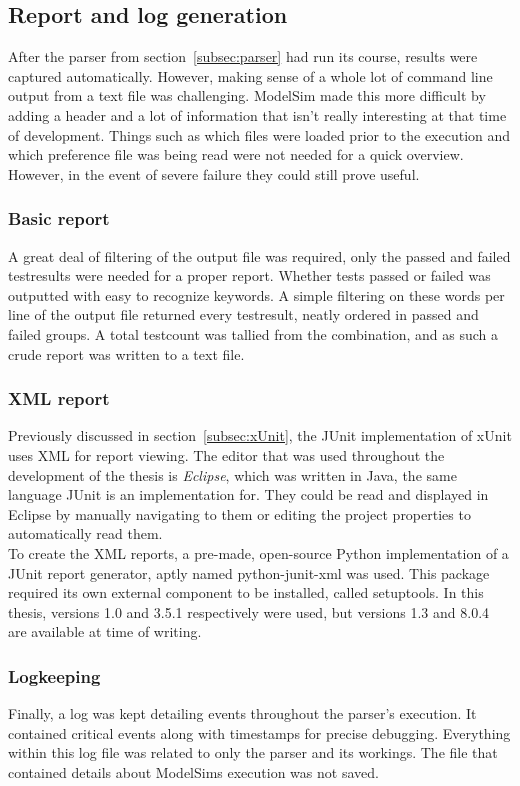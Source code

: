 \documentclass[11pt,british]{article}
\begin{document}
\subsection{Report and log generation}
\label{subsec:reports}
After the parser from section~\ref{subsec:parser} had run its course, results were captured automatically. However, making sense of a whole lot of command line output from a text file was challenging. ModelSim made this more difficult by adding a header and a lot of information that isn't really interesting at that time of development. Things such as which files were loaded prior to the execution and which preference file was being read were not needed for a quick overview. However, in the event of severe failure they could still prove useful.

\subsubsection{Basic report}
A great deal of filtering of the output file was required, only the passed and failed testresults were needed for a proper report. Whether tests passed or failed was outputted with easy to recognize keywords. A simple filtering on these words per line of the output file returned every testresult, neatly ordered in passed and failed groups. A total testcount was tallied from the combination, and as such a crude report was written to a text file.

\subsubsection{XML report}
Previously discussed in section~\ref{subsec:xUnit}, the JUnit implementation of xUnit uses \gls{XML} for report viewing. The editor that was used throughout the development of the thesis is \emph{Eclipse}, which was written in Java, the same language JUnit is an implementation for. They could be read and displayed in Eclipse by manually navigating to them or editing the project properties to automatically read them.
\\[\baselineskip]
To create the XML reports, a pre-made, open-source Python implementation of a JUnit report generator, aptly named python-junit-xml was used. This package required its own external component to be installed, called setuptools.\cite{junitxml, setuptools} In this thesis, versions 1.0 and 3.5.1 respectively were used, but versions 1.3 and 8.0.4 are available at time of writing. 

\subsubsection{Logkeeping}
Finally, a log was kept detailing events throughout the parser's execution. It contained critical events along with timestamps for precise debugging. Everything within this log file was related to only the parser and its workings. The file that contained details about ModelSims execution was not saved.
\end{document}
